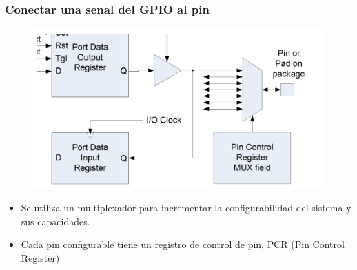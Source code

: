 \documentclass[10.5pt,scale=1.0,t,aspectratio=169,hyperref={pdfpagelabels=false}]{beamer}
\begin{document}
\begin{frame}
	\frametitle{Conectar una senal del GPIO al pin}
	\begin{figure}
		\centering
		\includegraphics[scale=0.3]{08_MuxCircuit}
	\end{figure}
	\begin{itemize}
		\item Se utiliza un multiplexador para incrementar la configurabilidad del sistema y sus capacidades. 
		\item Cada pin configurable tiene un registro de control de pin, PCR (Pin Control Register)
	\end{itemize}
\end{frame}
\end{document}

